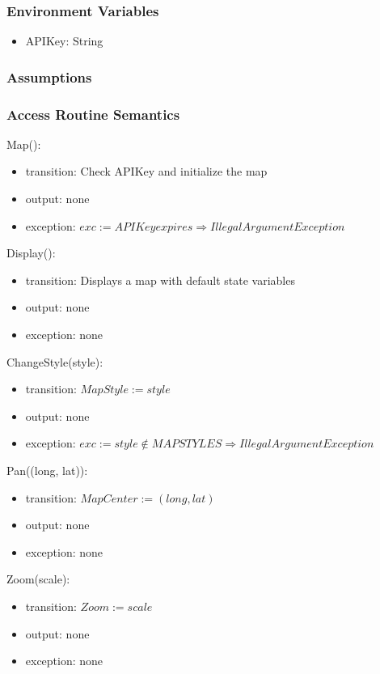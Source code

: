 \documentclass[12pt, titlepage]{article}
\begin{document}
\subsubsection{Environment Variables}

\begin{itemize}
\item APIKey: String
\end{itemize}

\subsubsection{Assumptions}

\subsubsection{Access Routine Semantics}

\noindent Map():
\begin{itemize}
\item transition: Check APIKey and initialize the map
\item output: none
\item exception: $exc := APIKey expires \Rightarrow IllegalArgument Exception$
\end{itemize}

\noindent Display():
\begin{itemize}
\item transition: Displays a map with default state variables
\item output: none
\item exception: none
\end{itemize}

\noindent ChangeStyle(style):
\begin{itemize}
\item transition: $MapStyle := style$
\item output: none
\item exception: $exc := style \notin MAPSTYLES \Rightarrow IllegalArgument Exception$
\end{itemize}

\noindent Pan((long, lat)):
\begin{itemize}
\item transition: $MapCenter := (long, lat)$
\item output: none
\item exception: none
\end{itemize}

\noindent Zoom(scale):
\begin{itemize}
\item transition: $Zoom := scale$
\item output: none
\item exception: none
\end{itemize}
\end{document}
